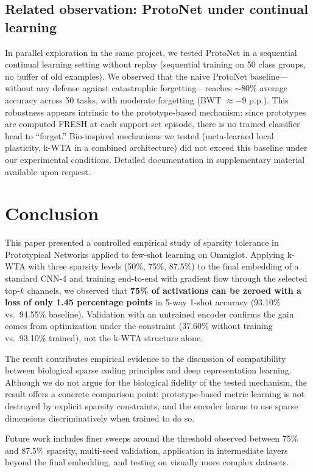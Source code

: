 \documentclass[11pt]{article}
\begin{document}
\subsection{Related observation: ProtoNet under continual learning}

In parallel exploration in the same project, we tested ProtoNet in a sequential continual learning setting without replay (sequential training on 50 class groups, no buffer of old examples). We observed that the naive ProtoNet baseline---without any defense against catastrophic forgetting---reaches $\sim$80\% average accuracy across 50 tasks, with moderate forgetting (BWT $\approx -9$ p.p.). This robustness appears intrinsic to the prototype-based mechanism: since prototypes are computed FRESH at each support-set episode, there is no trained classifier head to ``forget.'' Bio-inspired mechanisms we tested (meta-learned local plasticity, k-WTA in a combined architecture) did not exceed this baseline under our experimental conditions. Detailed documentation in supplementary material available upon request.

\section{Conclusion}
\label{sec:conclusion}

This paper presented a controlled empirical study of sparsity tolerance in Prototypical Networks applied to few-shot learning on Omniglot. Applying k-WTA with three sparsity levels (50\%, 75\%, 87.5\%) to the final embedding of a standard CNN-4 and training end-to-end with gradient flow through the selected top-$k$ channels, we observed that \textbf{75\% of activations can be zeroed with a loss of only 1.45 percentage points} in 5-way 1-shot accuracy (93.10\% vs.\ 94.55\% baseline). Validation with an untrained encoder confirms the gain comes from optimization under the constraint (37.60\% without training vs.\ 93.10\% trained), not the k-WTA structure alone.

The result contributes empirical evidence to the discussion of compatibility between biological sparse coding principles and deep representation learning. Although we do not argue for the biological fidelity of the tested mechanism, the result offers a concrete comparison point: prototype-based metric learning is not destroyed by explicit sparsity constraints, and the encoder learns to use sparse dimensions discriminatively when trained to do so.

Future work includes finer sweeps around the threshold observed between 75\% and 87.5\% sparsity, multi-seed validation, application in intermediate layers beyond the final embedding, and testing on visually more complex datasets.


\end{document}
